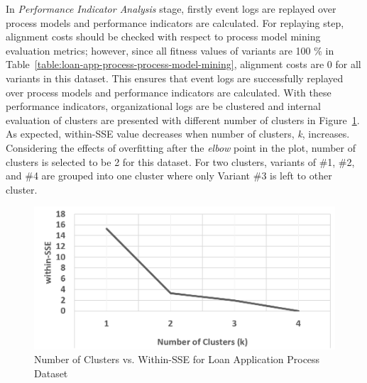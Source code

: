 In \textit{Performance Indicator Analysis} stage, firstly event logs are replayed over process models and performance indicators are calculated. For replaying step, alignment costs should be checked with respect to process model mining evaluation metrics; however, since all fitness values of variants are 100 \% in Table~\ref{table:loan-app-process-process-model-mining}, alignment costs are 0 for all variants in this dataset. This ensures that event logs are successfully replayed over process models and performance indicators are calculated. With these performance indicators, organizational logs are be clustered and internal evaluation of clusters are presented with different number of clusters in Figure~\ref{fig:loan-cluster-sse-plot}. As expected, within-SSE value decreases when number of clusters, \textit{k}, increases. Considering the effects of overfitting after the \textit{elbow} point in the plot, number of clusters is selected to be 2 for this dataset. For two clusters, variants of \#1, \#2, and \#4 are grouped into one cluster where only Variant \#3 is left to other cluster.
\begin{figure}
	\centering
	\includegraphics[width=.7\textwidth]{5_results_discussions/loan-application-process/cluster-sse-plot}
	\caption{Number of Clusters vs. Within-SSE for Loan Application Process Dataset}
  \label{fig:loan-cluster-sse-plot}
\end{figure}


